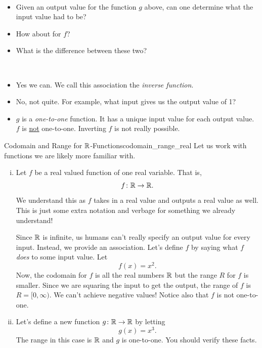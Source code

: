     \begin{question}~
    \begin{itemize}
        \item Given an output value for the function $g$ above, can one determine what the input value had to be?
        \item How about for $f$?
        \item What is the difference between these two? 
    \end{itemize}
    \end{question}
    
    \begin{answer}~
        \begin{itemize}
            \item Yes we can. We call this association the \emph{inverse function}.
            \item No, not quite.  For example, what input gives us the output value of 1?
            \item $g$ is a \emph{one-to-one} function. It has a unique input value for each output value. $f$ is \underline{not} one-to-one.  Inverting $f$ is not really possible.
        \end{itemize}
    \end{answer}
    
    \begin{ex}{Codomain and Range for $\mathbb{R}$-Functions}{codomain_range_real}
        Let us work with functions we are likely more familiar with.  
        \begin{enumerate}[(i)]
            \item Let $f$ be a real valued function of one real variable. That is, 
            \[
            f\colon \mathbb{R} \to \mathbb{R}.
            \]
            We understand this as $f$ takes in a real value and outputs a real value as well.  This is just some extra notation and verbage for something we already understand!
            
            Since $\mathbb{R}$ is infinite, us humans can't really specify an output value for every input.  Instead, we provide an association.  Let's define $f$ by saying what $f$ \emph{does} to some input value.  Let
            \[
            f(x)=x^2.
            \]
            Now, the codomain for $f$ is all the real numbers $\mathbb{R}$ but the range $R$ for $f$ is smaller.  Since we are squaring the input to get the output, the range of $f$ is $R=[0,\infty)$.  We can't achieve negative values! Notice also that $f$ is not one-to-one.
            
            \item Let's define a new function $g\colon \mathbb{R} \to \mathbb{R}$ by letting
            \[
            g(x)=x^3.
            \]
            The range in this case is $\mathbb{R}$ and $g$ is one-to-one. You should verify these facts.
        \end{enumerate}
    \end{ex}
    
